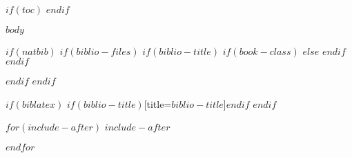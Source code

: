 \documentclass[$if(fontsize)$$fontsize$,$endif$$if(lang)$$lang$,$endif$$if(papersize)$$papersize$,$endif$$for(classoption)$$classoption$$sep$,$endfor$]{$documentclass$}	%
\begin{document}

$if(toc)$
\tableofcontents*
\cleardoublepage
$endif$



\textual	%
$body$	%

$if(natbib)$
$if(biblio-files)$
$if(biblio-title)$
$if(book-class)$
\renewcommand\bibname{$biblio-title$}
$else$
\renewcommand\refname{$biblio-title$}
$endif$
$endif$


$endif$
$endif$


$if(biblatex)$
\printbibliography$if(biblio-title)$[title=$biblio-title$]$endif$
$endif$

$for(include-after)$
$include-after$


$endfor$
\end{document}
